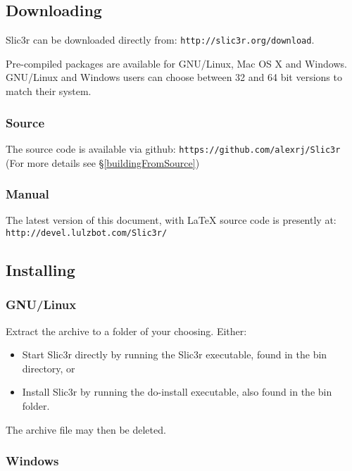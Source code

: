 
\subsection{Downloading}

Slic3r can be downloaded directly from: \texttt{http://slic3r.org/download}.

Pre-compiled packages are available for GNU/Linux, Mac OS X and Windows.  GNU/Linux and Windows users can choose between 32 and 64 bit versions to match their system.

\subsubsection{Source}
The source code is available via github: \texttt{https://github.com/alexrj/Slic3r} (For more details see §\ref{buildingFromSource})

\subsubsection{Manual}
The latest version of this document, with {\LaTeX} source code is presently at: \texttt{http://devel.lulzbot.com/Slic3r/}


\subsection{Installing}

\subsubsection{GNU/Linux}

Extract the archive to a folder of your choosing.
Either:
\begin{itemize}
\item Start Slic3r directly by running the Slic3r executable, found in the bin directory, or
\item Install Slic3r by running the do-install executable, also found in the bin folder.
\end{itemize}
The archive file may then be deleted.

\subsubsection{Windows}

